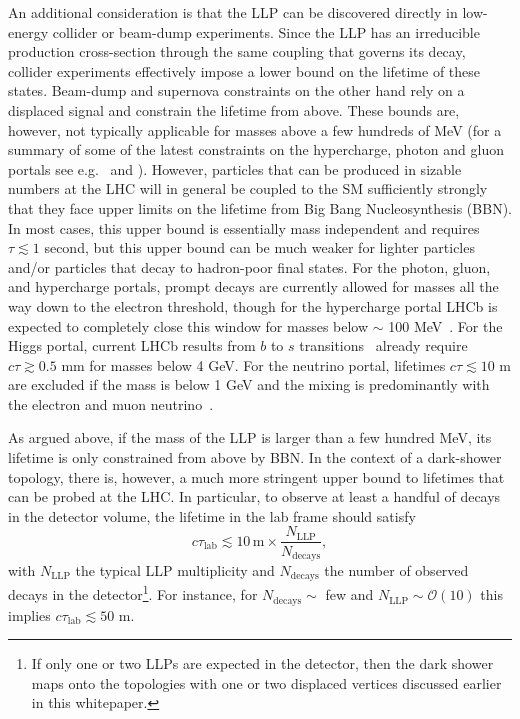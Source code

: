 \begin{enumerate}
An additional consideration is that the LLP can be discovered directly in low-energy collider or beam-dump experiments. Since the LLP has an irreducible production cross-section through the same coupling that governs its decay, collider experiments effectively impose a lower bound on the lifetime of these states. Beam-dump and supernova constraints on the other hand rely on a displaced signal and constrain the lifetime from above. These bounds are, however, not typically applicable for masses above a few hundreds of MeV (for a summary of some of the latest constraints on the hypercharge, photon and gluon portals see e.g.~\cite{Ilten:2018crw} and \cite{Bauer:2017ris}).   However, particles that can be produced in sizable numbers at the LHC will in general be coupled to the SM sufficiently strongly that they face upper limits on the lifetime from Big Bang Nucleosynthesis (BBN).   In most cases, this upper bound is essentially mass independent and requires $\tau\lesssim 1$ second, but this upper bound can be much weaker for lighter particles and/or particles that decay to hadron-poor final states.  For the photon, gluon, and hypercharge portals, prompt decays are currently allowed for masses all the way down to the electron threshold, though for the hypercharge portal LHCb is expected to completely close this window for masses below $\sim$ 100 MeV~\cite{Ilten:2015hya,Ilten:2016tkc}. For the Higgs  portal, current LHCb results from $b$ to $s$ transitions~\cite{Aaij:2015tna,Aaij:2016qsm} already require $c\tau \gtrsim 0.5$ mm for masses below 4 GeV. For the neutrino portal, lifetimes $c\tau\lesssim 10$ m are excluded if the mass is below 1 GeV and the mixing is predominantly with the electron and muon neutrino~\cite{Deppisch:2015qwa}.

As argued above, if the mass of the LLP is larger than a few hundred MeV, its lifetime is only constrained from above by BBN. In the context of a dark-shower topology, there is, however, a much more stringent upper bound to lifetimes that can be probed at the LHC. In particular, to observe at least a handful of decays in the detector volume, the lifetime in the lab frame should satisfy
\begin{equation}
c\tau_{\text{lab}} \lesssim 10 \,\text{m}\times \frac{N_{\text{LLP}}}{N_{\text{decays}}},
\end{equation}
with $N_{\text{LLP}}$ the typical LLP multiplicity and $N_{\text{decays}}$ the number of observed decays in the detector\footnote{If only one or two LLPs are expected in the detector, then the dark shower maps onto the topologies with one or two displaced vertices discussed earlier in this whitepaper.}.  For instance, for $N_{\text{decays}}\sim$ few and $N_{\text{LLP}}\sim \mathcal{O}(10)$ this implies $c\tau_{\text{lab}}\lesssim 50$ m.




\end{enumerate}
